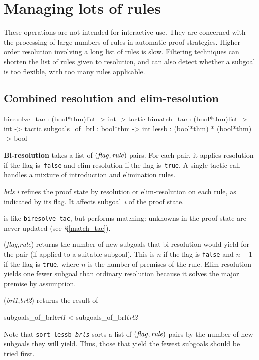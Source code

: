 \section{Managing lots of rules}
These operations are not intended for interactive use.  They are concerned
with the processing of large numbers of rules in automatic proof
strategies.  Higher-order resolution involving a long list of rules is
slow.  Filtering techniques can shorten the list of rules given to
resolution, and can also detect whether a subgoal is too flexible,
with too many rules applicable.

\subsection{Combined resolution and elim-resolution} \label{biresolve_tac}
\begin{ttbox} 
biresolve_tac   : (bool*thm)list -> int -> tactic
bimatch_tac     : (bool*thm)list -> int -> tactic
subgoals_of_brl : bool*thm -> int
lessb           : (bool*thm) * (bool*thm) -> bool
\end{ttbox}
{\bf Bi-resolution} takes a list of $\it (flag,rule)$ pairs.  For each
pair, it applies resolution if the flag is~{\tt false} and
elim-resolution if the flag is~{\tt true}.  A single tactic call handles a
mixture of introduction and elimination rules.

\begin{ttdescription}
\item[\ttindexbold{biresolve_tac} {\it brls} {\it i}] 
refines the proof state by resolution or elim-resolution on each rule, as
indicated by its flag.  It affects subgoal~$i$ of the proof state.

\item[\ttindexbold{bimatch_tac}] 
is like {\tt biresolve_tac}, but performs matching: unknowns in the
proof state are never updated (see~\S\ref{match_tac}).

\item[\ttindexbold{subgoals_of_brl}({\it flag},{\it rule})] 
returns the number of new subgoals that bi-resolution would yield for the
pair (if applied to a suitable subgoal).  This is $n$ if the flag is
{\tt false} and $n-1$ if the flag is {\tt true}, where $n$ is the number
of premises of the rule.  Elim-resolution yields one fewer subgoal than
ordinary resolution because it solves the major premise by assumption.

\item[\ttindexbold{lessb} ({\it brl1},{\it brl2})] 
returns the result of 
\begin{ttbox}
subgoals_of_brl{\it brl1} < subgoals_of_brl{\it brl2}
\end{ttbox}
\end{ttdescription}
Note that \hbox{\tt sort lessb {\it brls}} sorts a list of $\it
(flag,rule)$ pairs by the number of new subgoals they will yield.  Thus,
those that yield the fewest subgoals should be tried first.


